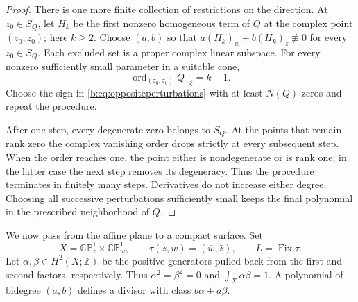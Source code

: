 \documentclass[UTF8,11pt]{ctexart}
\theoremstyle{definition}
\numberwithin{equation}{section}
\newcommand{\CP}{\mathbb {CP}}\newcommand{\cP}{\mathcal P}
\DeclareMathOperator{\ord}{ord}\DeclareMathOperator{\Fix}{Fix}
\begin{document}
\begin{proof}
There is one more finite collection of restrictions on the direction.
At $z_0\in S_Q$, let $H_k$ be the first nonzero homogeneous term of
$Q$ at the complex point $(z_0,\bar z_0)$; here $k\ge2$.
Choose $(a,b)$ so that $a(H_k)_w+b(H_k)_z\not\equiv0$ for every
$z_0\in S_Q$. Each excluded set is a proper complex linear subspace.
For every nonzero sufficiently small parameter in a suitable cone,
\[
 \ord_{(z_0,\bar z_0)}Q_{\pm\xi}=k-1.
\]
Choose the sign in \eqref{b:eq:oppositeperturbations} with at least
$N(Q)$ zeros and repeat the procedure.

After one step, every degenerate zero belongs to $S_Q$.
At the points that remain rank zero the complex vanishing order drops
strictly at every subsequent step. When the order reaches one, the
point either is nondegenerate or is rank one; in the latter case the
next step removes its degeneracy. Thus the procedure terminates in
finitely many steps. Derivatives do not increase either degree.
Choosing all successive perturbations sufficiently small keeps the
final polynomial in the prescribed neighborhood of $Q$.
\end{proof}

We now pass from the affine plane to a compact surface. Set
\[
 X=\CP^1_z\times\CP^1_w,\qquad
 \tau(z,w)=(\bar w,\bar z),\qquad
 L=\Fix\tau.
\]
Let $\alpha,\beta\in H^2(X;\mathbb Z)$ be the positive generators
pulled back from the first and second factors, respectively. Thus
$\alpha^2=\beta^2=0$ and $\int_X\alpha\beta=1$.
A polynomial of bidegree $(a,b)$ defines a divisor with class
$b\alpha+a\beta$.
\end{document}
